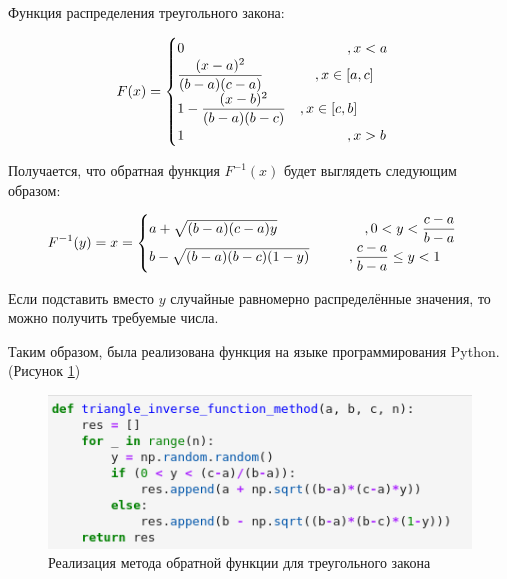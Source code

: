 \documentclass[14pt,fleqn]{extarticle}
\begin{document}
    Функция распределения треугольного закона:
    \begin{ceqn}
	\begin{align*}
		F(x) =
		\begin{cases}
			0 \hspace{4.1cm} , x < a\\
			\dfrac{(x-a)^2}{(b-a)(c-a)} \hspace{1.3cm} , x \in [a,c]\\
			1 - \dfrac{(x-b)^2}{(b-a)(b-c)} \quad , x \in [c,b]\\
			1 \hspace{4.1cm} , x > b\\
		\end{cases}
	\end{align*}
    \end{ceqn}

	Получается, что обратная функция $F^{-1}(x)$ будет выглядеть следующим образом:
	\begin{ceqn}
	\begin{align*}
		F^{-1}(y) = x =
		\begin{cases}
			a + \sqrt{(b-a)(c-a)y} \hspace{2.2cm} , 0 < y < \dfrac{c-a}{b-a}\\
			b - \sqrt{(b-a)(b-c)(1-y)} \hspace{1cm} , \dfrac{c-a}{b-a} \leq y < 1\\
		\end{cases}
	\end{align*}
    \end{ceqn}

	Если подставить вместо $y$ случайные равномерно распределённые значения, то можно получить требуемые числа.
	
	Таким образом, была реализована функция на языке программирования Python. (Рисунок \ref{fig:triangle_inverse_function_method_code})
	\begin{figure}[h]
		\centering \includegraphics[scale=0.7]{triangle_inverse_function_method_code}
		\caption{Реализация метода обратной функции для треугольного закона}
		\label{fig:triangle_inverse_function_method_code}
	\end{figure}
\end{document}
